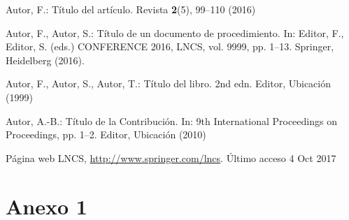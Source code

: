\documentclass[runningheads,a4paper]{llncs}
\begin{document}
\begin{thebibliography}{4}
Autor, F.: Título del artículo. Revista \textbf{2}(5), 99--110 (2016)

Autor, F., Autor, S.: Título de un documento de procedimiento. In: Editor, F., Editor, S. (eds.) CONFERENCE 2016, LNCS, vol. 9999, pp. 1--13. Springer, Heidelberg (2016).

Autor, F., Autor, S., Autor, T.: Título del libro. 2nd edn. Editor, Ubicación (1999)

Autor, A.-B.: Título de la Contribución. In: 9th International Proceedings on Proceedings, pp. 1--2. Editor, Ubicación (2010)

Página web LNCS, \url{http://www.springer.com/lncs}. Último acceso 4 Oct 2017
\end{thebibliography}

\section*{Anexo 1}
\end{document}
